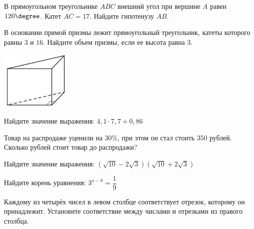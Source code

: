 \begin{class}[number=5]
\begin{listofex}
\begin{minipage}[t]{\picwidth}
		\end{minipage}
		\item В прямоугольном треугольнике \(ABC\) внешний угол при вершине \(A\) равен \(120\degree \). Катет \(AC = 17\). Найдите гипотенузу \(AB\).
		\item 
		\begin{minipage}[t]{\bodywidth}
			В основании прямой призмы лежит прямоугольный треугольник, катеты которого равны \(3\) и \(16\). Найдите объем призмы, если ее высота равна \(3\).
		\end{minipage}
		\hspace{0.02\linewidth}
		\begin{minipage}[t]{\picwidth}
			\includegraphics[align=t, width=\linewidth]{../pics/G101M8L5-7}
		\end{minipage}
		\item Найдите значение выражения: \( 4,1 \cdot 7,7 + 0,86 \)
		\item Товар на распродаже уценили на \(30\%\), при этом он стал стоить \(350\) рублей. Сколько рублей стоит товар до распродажи?
		\item Найдите значение выражения: \( (\sqrt{10}-2\sqrt{3})(\sqrt{10}+2\sqrt{3}) \)
		\item Найдите корень уравнения: \(3^{x-8}=\dfrac{ 1 }{ 9 }\)
		\item Каждому из четырѐх чисел в левом столбце соответствует отрезок, которому он принадлежит. Установите соответствие между числами и отрезками из правого столбца. \\ \\

\end{listofex}
\end{class}

